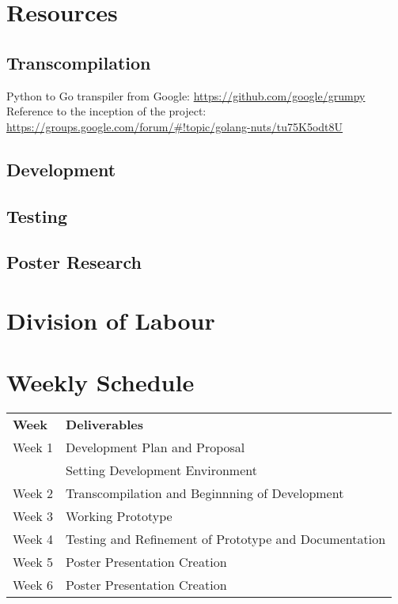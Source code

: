 \documentclass{article}
\begin{document}
\section{Resources}

\subsection{Transcompilation} %


Python to Go transpiler from Google: \url{https://github.com/google/grumpy}
Reference to the inception of the project: \url{https://groups.google.com/forum/#!topic/golang-nuts/tu75K5odt8U}

\subsection{Development} %

\subsection{Testing} %

\subsection{Poster Research} %

\section{Division of Labour} %

\section{Weekly Schedule} %

\begin{center}
\begin{tabular}{ l | l }
  \textbf{Week} & \textbf{Deliverables} \\
  \hhline{=|=}
  Week 1 & Development Plan and Proposal\\
         & Setting Development Environment\\ 
  Week 2 & Transcompilation and Beginnning of Development\\
  Week 3 & Working Prototype\\
  Week 4 & Testing and Refinement of Prototype and Documentation\\
  Week 5 & Poster Presentation Creation\\
  Week 6 & Poster Presentation Creation\\
\end{tabular}
\end{center}

\end{document}
